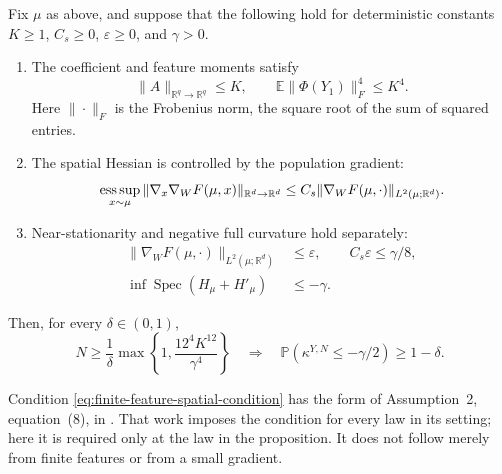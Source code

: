 \begin{proposition}
\label{prop:finite-feature-negative-curvature}
Fix $\mu$ as above, and suppose that the following hold for deterministic
constants $K\ge1$, $C_s\ge0$, $\varepsilon\ge0$, and $\gamma>0$.
\begin{enumerate}
 \item The coefficient and feature moments satisfy
 \begin{equation}
 \|A\|_{\mathbb R^q\to\mathbb R^q}\le K,\qquad
 \mathbb E\|\Phi(Y_1)\|_F^4\le K^4.
 \label{eq:finite-feature-common-bound}
 \end{equation}
 Here $\|\cdot\|_F$ is the Frobenius norm, the square root of the sum of
 squared entries.
 \item The spatial Hessian is controlled by the population gradient:
 \begin{equation}
 \mathop{\rm ess\,sup}_{x\sim\mu}
 \|\nabla_x\nabla_WF(\mu,x)\|_{\mathbb R^d\to\mathbb R^d}
 \le C_s\|\nabla_WF(\mu,\cdot)\|_{L^2(\mu;\mathbb R^d)}.
 \label{eq:finite-feature-spatial-condition}
 \end{equation}
 \item Near-stationarity and negative full curvature hold separately:
 \begin{equation}
 \begin{split}
 \|\nabla_WF(\mu,\cdot)\|_{L^2(\mu;\mathbb R^d)}&\le\varepsilon,
       \qquad C_s\varepsilon\le\gamma/8,\\
 \inf\operatorname{Spec}(H_\mu+H'_\mu)&\le-\gamma.
 \end{split}
 \label{eq:finite-feature-negative-gap}
 \end{equation}
\end{enumerate}
Then, for every $\delta\in(0,1)$,
\begin{equation}
 N\ge\frac1\delta\max\left\{1,\frac{12^4K^{12}}{\gamma^4}\right\}
 \quad\Longrightarrow\quad
 \mathbb P(\kappa^{Y,N}\le-\gamma/2)\ge1-\delta.
 \label{eq:finite-feature-negative-transfer}
\end{equation}
\end{proposition}

Condition \eqref{eq:finite-feature-spatial-condition} has the form of
Assumption~2, equation~(8), in \citet{yamamoto2025hessianguided}.
That work imposes the condition for every law in its setting; here it is
required only at the law in the proposition. It does not follow merely
from finite features or from a small gradient.

